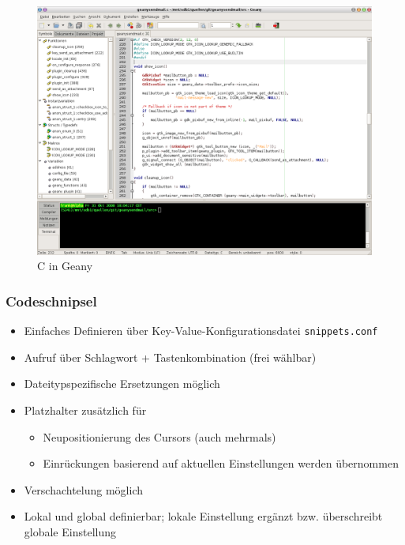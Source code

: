 \documentclass[compress]{beamer}
\begin{document}
\begin{frame}
	\begin{figure}
		\includegraphics[scale=0.3]{img/C_mit_symbol_2.png}\\
		\tiny C in Geany
	\end{figure}
\end{frame}

\begin{frame}
	\frametitle{Codeschnipsel}
	\begin{block}{}
		\begin{itemize}
			\item Einfaches Definieren über Key-Value-Konfigurationsdatei
				  \texttt{snippets.conf}
			\item Aufruf über Schlagwort + Tastenkombination (frei wählbar)
			\item Dateitypspezifische Ersetzungen möglich
			\item Platzhalter zusätzlich für
				\begin{itemize}
					\item Neupositionierung des Cursors (auch mehrmals)
					\item Einrückungen basierend auf aktuellen Einstellungen
						  werden übernommen
				\end{itemize}
			\item Verschachtelung möglich
			\item Lokal und global definierbar; lokale Einstellung
				  ergänzt bzw. überschreibt globale Einstellung
		\end{itemize}
	\end{block}
\end{frame}
\end{document}
